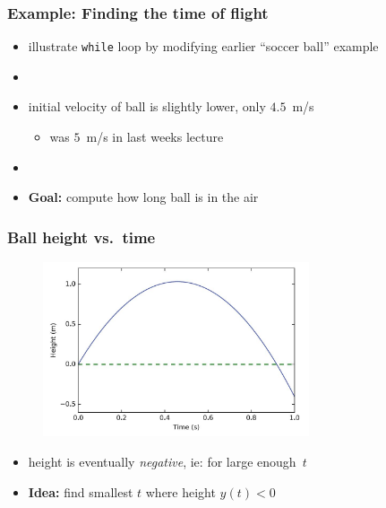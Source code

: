 \documentclass[english,14pt]{beamer}
\begin{document}

\begin{frame}[fragile]

\frametitle{Example: Finding the time of flight}

\begin{itemize}
	\item illustrate \texttt{while} loop by modifying earlier ``soccer ball'' example
	\item[]
	\item initial velocity of ball is slightly lower, only $4.5$~m/s
	\begin{itemize}
		\item was $5$~m/s in last weeks lecture
	\end{itemize}
	\item[]
	\item[]\textbf{Goal:} compute how long ball is in the air
\end{itemize}

\end{frame}


\begin{frame}[fragile]

\frametitle{Ball height vs.\ time}

\begin{figure}[ht]
	\centering
	\includegraphics[width=0.7\textwidth]{figures/LLp66output}
\end{figure}

\vspace*{-5mm}
\begin{itemize}
	\item height is eventually \emph{negative}, ie: for large enough~$t$
	\item \textbf{Idea:} find smallest $t$ where height $y(t) < 0$
\end{itemize}
	
\end{frame}
\end{document}
